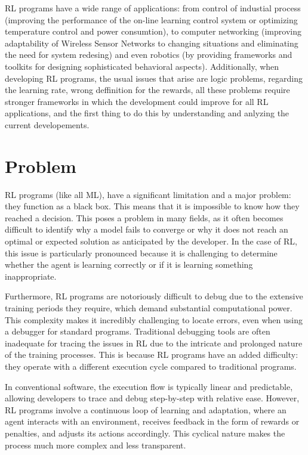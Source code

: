 \ac{RL} programs have a wide range of applications\cite{8836506}: from control of industial process (improving 
the performance of the on-line learning control system or optimizing temperature control and power consumtion),
to computer networking (improving adaptability of Wireless Sensor Networks to changing situations and eliminating 
the need for system redesing) and even robotics (by providing frameworks and toolkits for designing sophisticated 
behavioral aspects). Additionally, when developing \ac{RL} programs, the usual issues that arise are logic problems, 
regarding the learning rate, wrong deffinition for the rewards, all these problems require stronger frameworks in which 
the development could improve for all \ac{RL} applications, and the first thing to do this by understanding and anlyzing
the current developements.

\section{Problem}

\ac{RL} programs (like all \ac{ML}), 
have a significant limitation and a major problem: they function as a black box. 
This means that it is impossible to know how they reached a decision. This poses 
a problem in many fields, as it often becomes difficult to identify why a model 
fails to converge or why it does not reach an optimal or expected solution as 
anticipated by the developer. In the case of \ac{RL}, this issue is particularly 
pronounced because it is challenging to determine whether the agent is learning 
correctly or if it is learning something inappropriate.

Furthermore, \ac{RL} programs are notoriously difficult to debug due to the extensive 
training periods they require, which demand substantial computational power. This 
complexity makes it incredibly challenging to locate errors, even when using a 
debugger for standard programs. Traditional debugging tools are often inadequate 
for tracing the issues in \ac{RL} due to the intricate and prolonged nature of the 
training processes. This is because \ac{RL} programs have an added difficulty: they 
operate with a different execution cycle compared to traditional programs.

In conventional software, the execution flow is typically linear and predictable, 
allowing developers to trace and debug step-by-step with relative ease. However, 
\ac{RL} programs involve a continuous loop of learning and adaptation, where an agent 
interacts with an environment, receives feedback in the form of rewards or 
penalties, and adjusts its actions accordingly. This cyclical nature makes the 
process much more complex and less transparent.

